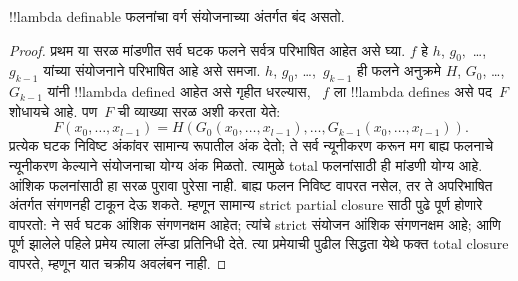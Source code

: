 \documentclass[../../../include/open-logic-section]{subfiles}
\begin{document}

\begin{lem}
!!{lambda definable} फलनांचा वर्ग संयोजनाच्या अंतर्गत बंद असतो.
\end{lem}

\begin{proof}
प्रथम या सरळ मांडणीत सर्व घटक फलने सर्वत्र परिभाषित आहेत
असे घ्या. $f$ हे $h$, $g_0,$ \dots,~$g_{k-1}$ यांच्या संयोजनाने
परिभाषित आहे असे समजा. $h$, $g_0$, \dots,~$g_{k-1}$
ही फलने अनुक्रमे $H$, $G_0$, \dots,~$G_{k-1}$
यांनी !!{lambda defined} आहेत असे गृहीत धरल्यास,
~$f$ ला !!{lambda define}s असे पद~$F$ शोधायचे आहे.
पण~$F$ ची व्याख्या सरळ अशी करता येते:
\[
F(x_0, \dots, x_{l-1}) = H(G_0(x_0, \dots, x_{l-1}),
\dots, G_{k-1}(x_0, \dots, x_{l-1})).
\]
प्रत्येक घटक निविष्ट अंकांवर सामान्य रूपातील अंक देतो;
ते सर्व न्यूनीकरण करून मग बाह्य फलनाचे न्यूनीकरण केल्याने
संयोजनाचा योग्य अंक मिळतो. त्यामुळे total फलनांसाठी ही
मांडणी योग्य आहे.
आंशिक फलनांसाठी हा सरळ पुरावा पुरेसा नाही. बाह्य फलन
निविष्ट वापरत नसेल, तर ते अपरिभाषित अंतर्गत संगणनही
टाकून देऊ शकते. म्हणून सामान्य strict partial closure साठी
पुढे पूर्ण होणारे  वापरतो:
 ने सर्व घटक आंशिक संगणनक्षम
आहेत; त्यांचे strict संयोजन आंशिक संगणनक्षम आहे; आणि
पूर्ण झालेले पहिले प्रमेय त्याला लॅम्डा प्रतिनिधी देते.
त्या प्रमेयाची पुढील सिद्धता येथे फक्त total closure वापरते,
म्हणून यात चक्रीय अवलंबन नाही.
\end{proof}
\end{document}
